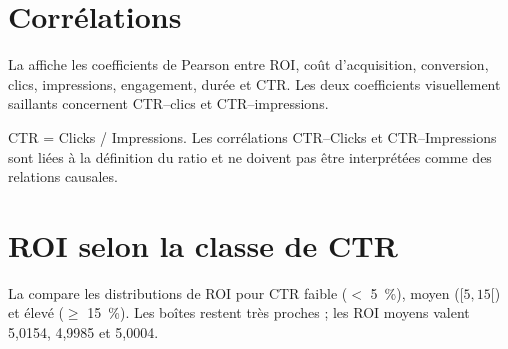 \section{Corrélations}

La  affiche les coefficients de Pearson entre ROI, coût d'acquisition, conversion, clics, impressions, engagement, durée et CTR. Les deux coefficients visuellement saillants concernent CTR--clics et CTR--impressions.


\begin{warningbox}
CTR = Clicks / Impressions. Les corrélations CTR--Clicks et CTR--Impressions sont liées à la définition du ratio et ne doivent pas être interprétées comme des relations causales.
\end{warningbox}

\section{ROI selon la classe de CTR}

La  compare les distributions de ROI pour CTR faible ($<$ 5~\%), moyen ($[5,15[$) et élevé ($\geq$ 15~\%). Les boîtes restent très proches ; les ROI moyens valent 5,0154, 4,9985 et 5,0004.

